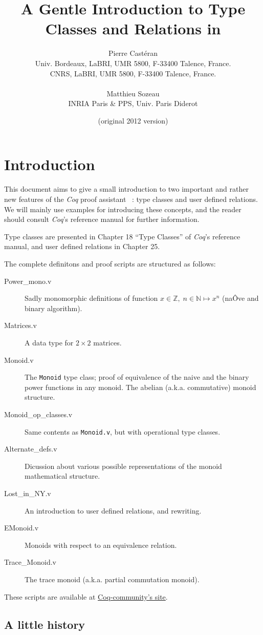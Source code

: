 \documentclass[a4]{report}
\title{A Gentle Introduction to Type Classes and Relations in \coq{}}
\author{Pierre Castéran\\Univ. Bordeaux, LaBRI, UMR 5800, F-33400 Talence, France.\\
CNRS, LaBRI, UMR 5800, F-33400 Talence, France.\\
\\
Matthieu Sozeau\\INRIA Paris \& PPS, Univ. Paris Diderot}
\date{(original 2012 version)}
\newcommand{\coq}{\mbox{\emph{Coq}}}
\begin{document}
\maketitle

\chapter{Introduction}

This document aims to give a small introduction to two important and
rather new features of the {\coq} proof assistant~\citep{Coq, coqart} : type classes and user defined
relations. We will mainly use examples for introducing these concepts, and 
the reader should consult \coq's reference manual for further information.

Type classes are presented in Chapter 18 ``Type Classes''  of {\coq}'s reference manual, and user defined relations in Chapter 25.

The complete definitons and proof scripts are structured as follows:
\begin{description}
\item[Power\_mono.v] Sadly monomorphic definitions of function
   $x\in \mathbb{Z},\;n\in\mathbb{N}\mapsto x^n$ (naÔve and binary algorithm).
\item[Matrices.v] A data type for $2\times 2$ matrices.
\item[Monoid.v] The \texttt{Monoid} type class; proof of equivalence of
  the naive and the binary power functions in any monoid. The abelian
  (a.k.a. commutative) monoid structure.
\item[Monoid\_op\_classes.v]
  Same contents as \texttt{Monoid.v}, but with operational type classes.
\item[Alternate\_defs.v] Dicussion about various possible representations of
        the monoid mathematical structure.
\item[Lost\_in\_NY.v] An introduction to user defined relations, and rewriting.
\item[EMonoid.v]  Monoids with respect to an equivalence relation.
\item[Trace\_Monoid.v] The trace monoid (a.k.a. partial commutation monoid).
\end{description}

These scripts are available at
\href{https://github.com/coq-community/coq-art/tree/master/tutorial_type_classes/SRC}{Coq-community's site}.

\section{A little history}
\end{document}
